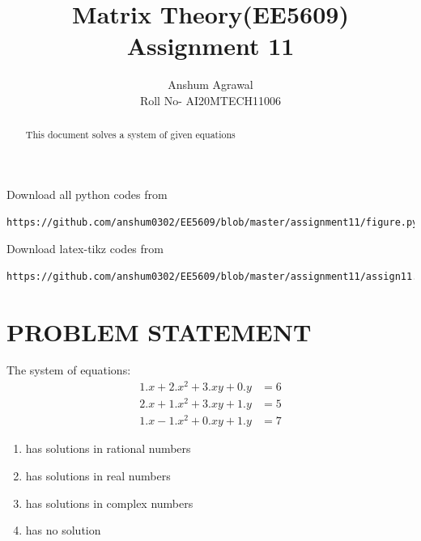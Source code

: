 \documentclass[journal,12pt,twocolumn]{IEEEtran}
\begin{document}
\makeatother
\let\StandardTheFigure\thefigure
\let\vec\mathbf
\renewcommand{\thefigure}{\theproblem}
\def\putbox#1#2#3{\makebox[0in][l]{\makebox[#1][l]{}\raisebox{\baselineskip}[0in][0in]{\raisebox{#2}[0in][0in]{#3}}}}
     \def\rightbox#1{\makebox[0in][r]{#1}}
     \def\centbox#1{\makebox[0in]{#1}}
     \def\topbox#1{\raisebox{-\baselineskip}[0in][0in]{#1}}
     \def\midbox#1{\raisebox{-0.5\baselineskip}[0in][0in]{#1}}
\vspace{3cm}
\title{Matrix Theory(EE5609) Assignment 11}
\author{Anshum Agrawal \\ Roll No- AI20MTECH11006}
%
\maketitle
\newpage
\bigskip
\renewcommand{\thefigure}{\theenumi}
\renewcommand{\thetable}{\arabic{table}}
\begin{abstract}
This document solves a system of given equations
\end{abstract}
Download all python codes from
%                           
\begin{lstlisting}
https://github.com/anshum0302/EE5609/blob/master/assignment11/figure.py
\end{lstlisting}
%
Download latex-tikz codes from 
%
\begin{lstlisting}
https://github.com/anshum0302/EE5609/blob/master/assignment11/assign11.tex
\end{lstlisting}
%
\section{\textbf{PROBLEM STATEMENT}}
The system of equations:
\begin{align*}
    1.x+2.x^2+3.xy+0.y &= 6\\
    2.x+1.x^2+3.xy+1.y &= 5\\
    1.x-1.x^2+0.xy+1.y &= 7
\end{align*}
\begin{enumerate}
    \item has solutions in rational numbers  
    \item has solutions in real numbers
    \item has solutions in complex numbers
    \item has no solution
\end{enumerate}
\end{document}
